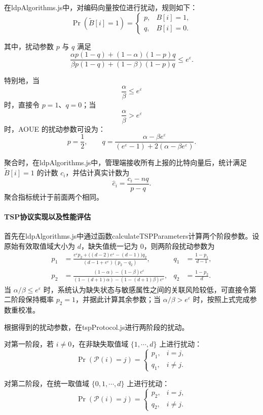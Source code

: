 \documentclass{cumcmthesis}
\numberwithin{equation}{section}
\numberwithin{figure}{section}
\numberwithin{table}{section}
\begin{document}
在ldpAlgorithms.js中，对编码向量按位进行扰动，规则如下：
\[
\Pr(\tilde{B}[i]=1)=
\begin{cases}
p, & B[i]=1,\\
q, & B[i]=0.
\end{cases}
\]

其中，扰动参数 \(p\) 与 \(q\) 满足
\[
\frac{\alpha p(1-q)+(1-\alpha)(1-p)q}
{\beta p(1-q)+(1-\beta)(1-p)q}
\le e^{\varepsilon}.
\]

特别地，当
\[
\frac{\alpha}{\beta}\le e^{\varepsilon}
\]
时，直接令 \(p=1\)、\(q=0\)；当
\[
\frac{\alpha}{\beta}> e^{\varepsilon}
\]
时，AOUE 的扰动参数可设为：
\[
p=\frac{1}{2},\qquad
q=\frac{\alpha-\beta e^{\varepsilon}}
{(e^{\varepsilon}-1)+2(\alpha-\beta e^{\varepsilon})}.
\]

聚合时，在ldpAlgorithms.js中，管理端接收所有上报的比特向量后，统计满足 \(\tilde{B}[i]=1\) 的计数 \(c_i\)，并估计真实计数为
\[
\hat{c}_i=\frac{c_i-nq}{p-q}.
\]
聚合指标统计于前面两个相同。

\paragraph{TSP协议实现以及性能评估}

首先在ldpAlgorithms.js中通过函数calculateTSPParameters计算两个阶段参数。设原始有效取值域大小为 \(d\)，缺失值统一记为 \(0\)，则两阶段扰动参数为
\[
\begin{aligned}
p_1&=\frac{e^{\varepsilon}p_2+\bigl((d-2)e^{\varepsilon}-(d-1)\bigr)q_2}
{(d-1+e^{\varepsilon})(p_2-q_2)},&
q_1&=\frac{1-p_1}{d-1},\\
p_2&=\frac{(1-\alpha)-(1-\beta)e^{\varepsilon}}
{(1-(d+1)\alpha)-(1-(d+1)\beta)e^{\varepsilon}},&
q_2&=\frac{1-p_2}{d}.
\end{aligned}
\]
当 \(\alpha/\beta\le e^{\varepsilon}\) 时，系统认为缺失状态与敏感属性之间的关联风险较低，可直接令第二阶段保持概率 \(p_2=1\)，并据此计算其余参数；当 \(\alpha/\beta>e^{\varepsilon}\) 时，按照上式完成参数重校准。

根据得到的扰动参数，在tspProtocol.js进行两阶段的扰动。

对第一阶段，若 \(i\ne 0\)，在非缺失取值域 \(\{1,\cdots,d\}\) 上进行扰动：
\[
\Pr(\mathcal{P}(i)=j)=
\begin{cases}
p_1, & i=j,\\
q_1, & i\ne j.
\end{cases}
\]

对第二阶段，在统一取值域 \(\{0,1,\cdots,d\}\) 上进行扰动：
\[
\Pr(\mathcal{P}(i)=j)=
\begin{cases}
p_2, & i=j,\\
q_2, & i\ne j.
\end{cases}
\]
\end{document}
